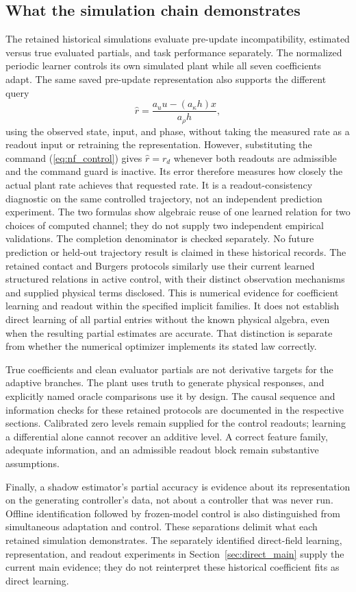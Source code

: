 \subsection{What the simulation chain demonstrates}
The retained historical simulations evaluate pre-update incompatibility, estimated versus
true evaluated partials, and task performance separately. The normalized
periodic learner controls its own simulated plant while all seven
coefficients adapt. The same saved pre-update representation also supports
the different query
\begin{equation}
 \widehat r=\frac{a_u u-(a_\kappa h)x}{a_\rho h},
 \label{eq:inventory_rate_readout}
\end{equation}
using the observed state, input, and phase, without taking the measured
rate as a readout input or retraining the representation. However,
substituting the command (\ref{eq:nf_control}) gives
$\widehat r=r_d$ whenever both readouts are admissible and the command
guard is inactive. Its error therefore measures how closely the actual
plant rate achieves that requested rate. It is a readout-consistency
diagnostic on the same controlled trajectory, not an independent
prediction experiment. The two formulas show algebraic reuse of one
learned relation for two choices of computed channel; they do not supply
two independent empirical validations. The completion denominator is
checked separately. No future prediction or held-out trajectory result
is claimed in these historical records. The retained contact and Burgers
protocols similarly use their current learned
structured relations in active control, with their distinct observation
mechanisms and supplied physical terms disclosed. This is numerical evidence
for coefficient learning and readout within the specified implicit families.
It does not establish direct learning of all partial entries without the
known physical algebra, even when the resulting partial estimates are
accurate. That distinction is separate from whether the numerical optimizer
implements its stated law correctly.

True coefficients and clean evaluator partials are not derivative targets
for the adaptive branches. The plant uses truth to generate physical
responses, and explicitly named oracle comparisons use it by design.
The causal sequence and information checks for these retained protocols are
documented in the respective sections. Calibrated zero levels remain
supplied for the control readouts; learning a differential alone cannot
recover an additive level. A correct feature family, adequate information,
and an admissible readout block remain substantive assumptions.

Finally, a shadow estimator's partial accuracy is evidence about its
representation on the generating controller's data, not about a controller
that was never run. Offline identification followed by frozen-model control
is also distinguished from simultaneous adaptation and control. These
separations delimit what each retained simulation demonstrates. The
separately identified direct-field learning, representation, and readout
experiments in Section~\ref{sec:direct_main} supply the current main evidence;
they do not reinterpret these historical coefficient fits as direct learning.
